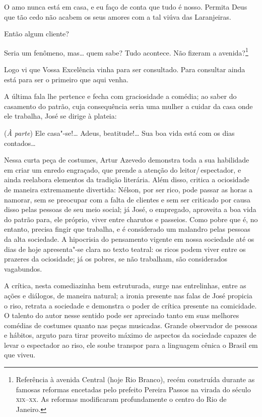 \begin{hedraquote} 
 O amo nunca está em casa, e eu faço de conta que tudo é nosso.
Permita Deus que tão cedo não acabem os seus amores com a tal viúva das
Laranjeiras.

 Então algum cliente?

 Seria um fenômeno, mas\ldots{} quem sabe? Tudo acontece. Não fizeram a
avenida?\footnote{ Referência à avenida Central (hoje Rio Branco),
recém construída durante as famosas reformas encetadas pelo prefeito
Pereira Passos na virada do século \textsc{xix}--\textsc{xx}. As reformas modificaram
profundamente o centro do Rio de Janeiro.}

 Logo vi que Vossa Excelência vinha para ser consultado. Para
consultar ainda está para ser o primeiro que aqui venha.
\end{hedraquote} 

A última fala lhe pertence e fecha com graciosidade a comédia; ao saber
do casamento do patrão, cuja consequência seria uma mulher a cuidar da
casa onde ele trabalha, José se dirige à plateia:

\begin{hedraquote} 
 (\textit{À parte}) Ele casa"-se!\ldots{} Adeus, beatitude!\ldots{}
Sua boa vida está com os dias contados\ldots{} 
\end{hedraquote} 

Nessa curta peça de costumes, Artur Azevedo demonstra toda a sua
habilidade em criar um enredo engraçado, que prende a atenção do
leitor/\,espectador, e ainda reelabora elementos da tradição literária.
Além disso, critica a ociosidade de maneira extremamente divertida:
Nélson, por ser rico, pode passar as horas a namorar, sem se preocupar
com a falta de clientes e sem ser criticado por causa disso pelas
pessoas de seu meio social; já José, o empregado, aproveita a boa vida
do patrão para, ele próprio, viver entre charutos e passeios. Como
pobre que é, no entanto, precisa fingir que trabalha, e é considerado
um malandro pelas pessoas da alta sociedade. A hipocrisia do pensamento
vigente em nossa sociedade até os dias de hoje apresenta"-se clara no
texto teatral: os ricos podem viver entre os prazeres da ociosidade; já
os pobres, se não trabalham, são considerados vagabundos.

A crítica, nesta comediazinha bem estruturada, surge nas entrelinhas,
entre as ações e diálogos, de maneira natural; a ironia presente nas
falas de José propicia o riso, retrata a sociedade e demonstra o poder
de crítica presente na comicidade. O talento do autor nesse sentido
pode ser apreciado tanto em suas melhores comédias de costumes quanto
nas peças musicadas. Grande observador de pessoas e hábitos, arguto
para tirar proveito máximo de aspectos da sociedade capazes de levar o
espectador ao riso, ele soube transpor para a linguagem cênica o Brasil
em que viveu. 

